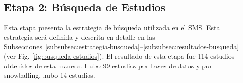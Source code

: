 \newcommand{\totalStudies}{114}
\newcommand{\databaseStudies}{99}
\newcommand{\snowballStudies}{14}
\newcommand{\directInclusionStudies}{0}


\newcommand{\acm}{518}
\newcommand{\ieee}{0}
\newcommand{\sd}{120}
\newcommand{\spr}{209}
\newcommand{\tf}{0}
\newcommand{\tot}{847}
\newcommand{\acmp}{\fpeval{round(\acm*100/\tot,2)}}
\newcommand{\ieeep}{\fpeval{round(\ieee*100/\tot,2)}}
\newcommand{\sdp}{\fpeval{round(\sd*100/\tot,2)}}
\newcommand{\sprp}{\fpeval{round(\spr*100/\tot,2)}}
\newcommand{\tfp}{\fpeval{round(\tf*100/\tot,2)}}


\newcommand{\iacm}{315}
\newcommand{\iieee}{0}
\newcommand{\isd}{101}
\newcommand{\ispr}{63}
\newcommand{\itf}{0}
\newcommand{\itot}{479}
\newcommand{\iacmp}{\fpeval{round(\iacm*100/\itot,2)}}
\newcommand{\iieeep}{\fpeval{round(\iieee*100/\itot,2)}}
\newcommand{\isdp}{\fpeval{round(\isd*100/\itot,2)}}
\newcommand{\isprp}{\fpeval{round(\ispr*100/\itot,2)}}
\newcommand{\itfp}{\fpeval{round(\itf*100/\itot,2)}}

\newcommand{\numEstEx}{3}

\newcommand{\depTot}{\fpeval{\itot-\numEstEx}}

\newcommand{\screen}{377}
\newcommand{\screenTot}{\fpeval{\depTot-\screen}}








\subsection{Etapa 2: Búsqueda de Estudios}

Esta etapa presenta la estrategia de búsqueda utilizada en el SMS\@. Esta estrategia será definida y descrita en detalle en las Subsecciones~\ref{subsubsec:estrategia-busqueda}--\ref{subsubsec:resultados-busqueda} (ver Fig. \ref{fig:busqueda-estudios}).
El resultado de esta etapa fue \totalStudies{} estudios obtenidos de esta manera. Hubo \databaseStudies{} estudios por bases de datos y por snowballing, hubo \snowballStudies{} estudios.


